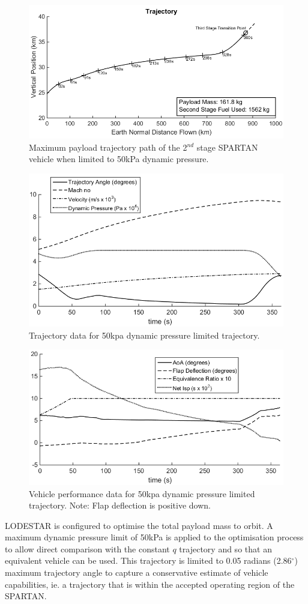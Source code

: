 \documentclass[]{aiaa-tc}
\begin{document}
\begin{figure}[ht]
	\centering
	\includegraphics[width=.7\linewidth]{qlimited50kPa}
	\caption{Maximum payload trajectory path of the 2$^{nd}$ stage SPARTAN vehicle when limited to 50kPa dynamic pressure.}
	\label{fig:qlimited}
\end{figure}
\begin{figure}[ht]
	\centering
	\includegraphics[width=.6\linewidth]{qlimited50kPa-aero}
	\caption{Trajectory data for 50kpa dynamic pressure limited trajectory.}
	\label{fig:qlimited aero}
\end{figure}
\begin{figure}[ht]
	\centering
	\includegraphics[width=.6\linewidth]{qlimited-Vehicle}
	\caption{Vehicle performance data for 50kpa dynamic pressure limited trajectory. Note: Flap deflection is positive down.}
	\label{fig:qlimited vehicle}
\end{figure}



LODESTAR is configured to optimise the total payload mass to orbit.
A maximum dynamic pressure limit of 50kPa is applied to the optimisation process to allow direct comparison with the constant $q$ trajectory and so that an equivalent vehicle can be used.   
 This trajectory is limited to 0.05 radians (2.86$^{\circ}$) maximum trajectory angle to capture a conservative estimate of vehicle capabilities, ie. a trajectory that is within the accepted operating region of the SPARTAN. 
\end{document}
